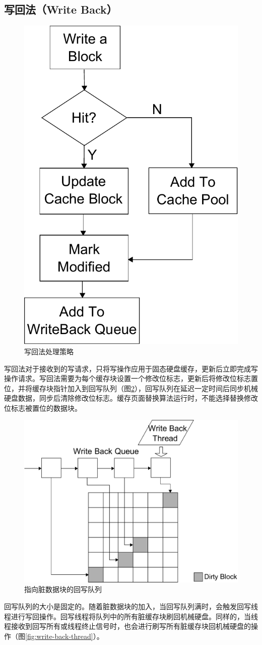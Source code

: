 \subsection{写回法（Write Back）}
\begin{figure}[H]
\centering
\includegraphics[width=0.4\linewidth]{./graph/write-back}
\caption{写回法处理策略}
\label{fig:write-back}
\end{figure}

写回法\cite{writeback2008}对于接收到的写请求，只将写操作应用于固态硬盘缓存，更新后立即完成写操作请求。写回法需要为每个缓存块设置一个修改位标志，更新后将修改位标志置位，并将缓存块指针加入到回写队列（图\ref{fig:write-back-queue}），回写队列在延迟一定时间后同步机械硬盘数据，同步后清除修改位标志。缓存页面替换算法运行时，不能选择替换修改位标志被置位的数据块。

\begin{figure}[H]
\centering
\includegraphics[width=0.6\linewidth]{./graph/write-back-queue}
\caption{指向脏数据块的回写队列}
\label{fig:write-back-queue}
\end{figure}

回写队列的大小是固定的。随着脏数据块的加入，当回写队列满时，会触发回写线程进行写回操作。回写线程将队列中的所有脏缓存块刷回机械硬盘。同样的，当线程接收到回写所有或线程终止信号时，也会进行刷写所有脏缓存块回机械硬盘的操作（图\ref{fig:write-back-thread}）。

